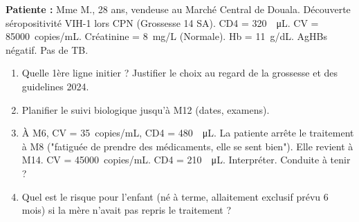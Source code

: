 \documentclass[11pt]{article}
\begin{document}
\begin{exercice}
\textbf{Patiente :} Mme M., 28 ans, vendeuse au Marché Central de Douala. Découverte séropositivité VIH-1 lors CPN (Grossesse 14 SA). CD4 = \SI{320}{\per\micro\liter}. CV = \SI{85000}{copies/mL}. Créatinine = \SI{8}{mg/L} (Normale). Hb = \SI{11}{g/dL}. AgHBs négatif. Pas de TB.
\begin{enumerate}
    \item Quelle 1ère ligne initier ? Justifier le choix au regard de la grossesse et des guidelines 2024.
    \item Planifier le suivi biologique jusqu'à M12 (dates, examens).
    \item À M6, CV = \SI{35}{copies/mL}, CD4 = \SI{480}{\per\micro\liter}. La patiente arrête le traitement à M8 ("fatiguée de prendre des médicaments, elle se sent bien"). Elle revient à M14. CV = \SI{45000}{copies/mL}. CD4 = \SI{210}{\per\micro\liter}. Interpréter. Conduite à tenir ?
    \item Quel est le risque pour l'enfant (né à terme, allaitement exclusif prévu 6 mois) si la mère n'avait pas repris le traitement ?
\end{enumerate}
\end{exercice}
\end{document}
